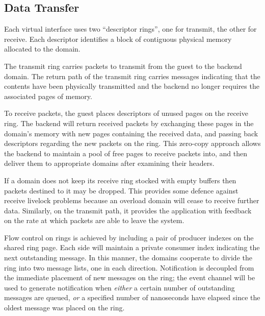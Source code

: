 \documentclass[11pt,twoside,final,openright]{report}
\begin{document}
\subsection{Data Transfer}

Each virtual interface uses two ``descriptor rings'', one for transmit,
the other for receive.  Each descriptor identifies a block of contiguous
physical memory allocated to the domain.  

The transmit ring carries packets to transmit from the guest to the
backend domain.  The return path of the transmit ring carries messages
indicating that the contents have been physically transmitted and the
backend no longer requires the associated pages of memory.

To receive packets, the guest places descriptors of unused pages on
the receive ring.  The backend will return received packets by
exchanging these pages in the domain's memory with new pages
containing the received data, and passing back descriptors regarding
the new packets on the ring.  This zero-copy approach allows the
backend to maintain a pool of free pages to receive packets into, and
then deliver them to appropriate domains after examining their
headers.

%

If a domain does not keep its receive ring stocked with empty buffers then 
packets destined to it may be dropped.  This provides some defence against 
receive livelock problems because an overload domain will cease to receive
further data.  Similarly, on the transmit path, it provides the application
with feedback on the rate at which packets are able to leave the system.


Flow control on rings is achieved by including a pair of producer
indexes on the shared ring page.  Each side will maintain a private
consumer index indicating the next outstanding message.  In this
manner, the domains cooperate to divide the ring into two message
lists, one in each direction.  Notification is decoupled from the
immediate placement of new messages on the ring; the event channel
will be used to generate notification when {\em either} a certain
number of outstanding messages are queued, {\em or} a specified number
of nanoseconds have elapsed since the oldest message was placed on the
ring.

\end{document}
